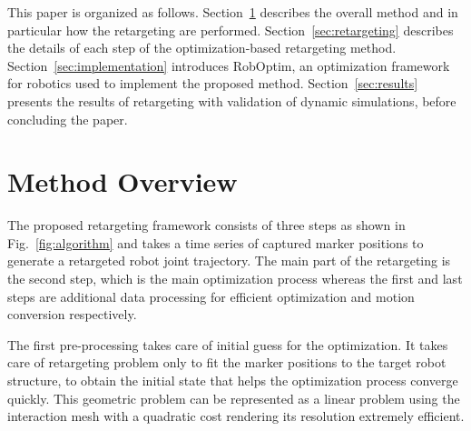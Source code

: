 \documentclass[letterpaper, 10 pt, conference]{ieeeconf}  %
\begin{document}
This paper is organized as follows. Section~\ref{sec:overview}
describes the overall method and in particular how the retargeting
are performed. Section~\ref{sec:retargeting} describes the
details of each step of the optimization-based retargeting method.
Section~\ref{sec:implementation} introduces 
RobOptim, an optimization framework for robotics used to implement the
proposed method. Section~\ref{sec:results} presents the results of
retargeting with validation of dynamic simulations, before concluding
the paper.

\section{Method Overview}
\label{sec:overview}

The proposed retargeting framework consists of three steps as shown in
Fig.~\ref{fig:algorithm} and  
takes a time series of captured marker positions to
generate a retargeted robot joint trajectory.  
The main part of the retargeting is the second step, which is the main
optimization process whereas the first and last steps are additional
data processing for efficient optimization and motion conversion
respectively. 

The first pre-processing takes care of initial guess for the
optimization. It takes care of retargeting problem only to fit the
marker positions to the target robot structure, to obtain the initial
state that helps the optimization process converge quickly.
This geometric problem can be represented as a
linear problem using the interaction mesh \cite{Komura10}
with a quadratic cost rendering its resolution
extremely efficient.
\end{document}
